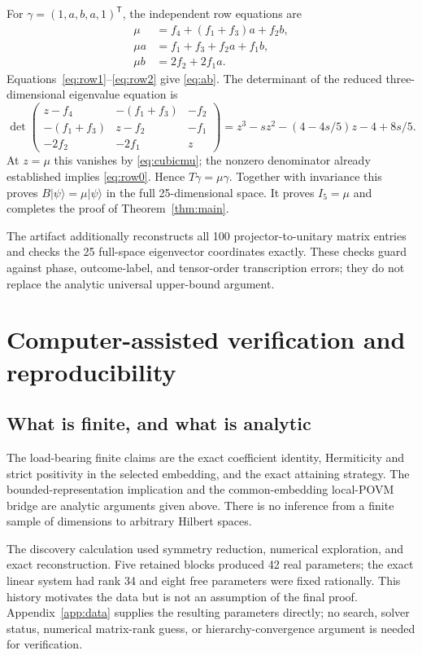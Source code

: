\documentclass[11pt,a4paper]{article}
\numberwithin{equation}{section}
\theoremstyle{remark}\newtheorem{remark}[theorem]{Remark}
\newcommand{\ket}[1]{\lvert #1\rangle}
\begin{document}
For $\gamma=(1,a,b,a,1)^{\mathsf T}$, the independent row equations are
\begin{align}
 \mu&=f_4+(f_1+f_3)a+f_2b,\label{eq:row0}\\
 \mu a&=f_1+f_3+f_2a+f_1b,\label{eq:row1}\\
 \mu b&=2f_2+2f_1a.\label{eq:row2}
\end{align}
Equations~\eqref{eq:row1}--\eqref{eq:row2} give \eqref{eq:ab}.
The determinant of the reduced three-dimensional eigenvalue equation is
\begin{equation}
 \det\begin{pmatrix}
 z-f_4&-(f_1+f_3)&-f_2\\
 -(f_1+f_3)&z-f_2&-f_1\\
 -2f_2&-2f_1&z
 \end{pmatrix}
 =z^3-sz^2-(4-4s/5)z-4+8s/5.
\end{equation}
At $z=\mu$ this vanishes by \eqref{eq:cubicmu}; the nonzero denominator
already established implies \eqref{eq:row0}. Hence $T\gamma=\mu\gamma$.
Together with invariance this proves $B\ket\psi=\mu\ket\psi$ in the full
25-dimensional space. It proves $I_5=\mu$ and completes the proof of
Theorem~\ref{thm:main}.

The artifact additionally reconstructs all 100 projector-to-unitary matrix
entries and checks the 25 full-space eigenvector coordinates exactly. These
checks guard against phase, outcome-label, and tensor-order transcription
errors; they do not replace the analytic universal upper-bound argument.

\section{Computer-assisted verification and reproducibility}\label{sec:repro}
\subsection{What is finite, and what is analytic}
The load-bearing finite claims are the exact coefficient identity,
Hermiticity and strict positivity in the selected embedding, and the exact
attaining strategy. The bounded-representation implication and the
common-embedding local-POVM bridge are analytic arguments given above.
There is no inference from a finite sample of dimensions to arbitrary
Hilbert spaces.

The discovery calculation used symmetry reduction, numerical exploration,
and exact reconstruction. Five retained blocks produced 42 real parameters;
the exact linear system had rank 34 and eight free parameters were fixed
rationally. This history motivates the data but is not an assumption of
the final proof. Appendix~\ref{app:data} supplies the resulting parameters
directly; no search, solver status, numerical matrix-rank guess, or
hierarchy-convergence argument is needed for verification.
\end{document}
